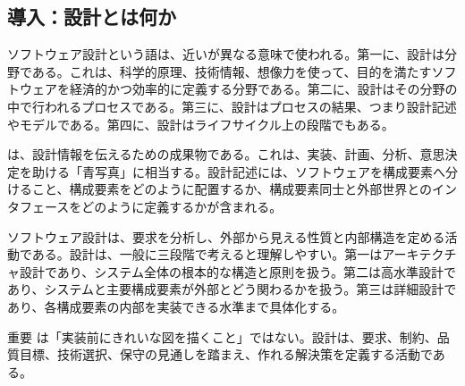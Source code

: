 \subsection*{導入：設計とは何か}

ソフトウェア設計という語は、近いが異なる意味で使われる。第一に、設計は分野である。これは、科学的原理、技術情報、想像力を使って、目的を満たすソフトウェアを経済的かつ効率的に定義する分野である。第二に、設計はその分野の中で行われるプロセスである。第三に、設計はプロセスの結果、つまり設計記述やモデルである。第四に、設計はライフサイクル上の段階でもある。

 は、設計情報を伝えるための成果物である。これは、実装、計画、分析、意思決定を助ける「青写真」に相当する。設計記述には、ソフトウェアを構成要素へ分けること、構成要素をどのように配置するか、構成要素同士と外部世界とのインタフェースをどのように定義するかが含まれる。

ソフトウェア設計は、要求を分析し、外部から見える性質と内部構造を定める活動である。設計は、一般に三段階で考えると理解しやすい。第一はアーキテクチャ設計であり、システム全体の根本的な構造と原則を扱う。第二は高水準設計であり、システムと主要構成要素が外部とどう関わるかを扱う。第三は詳細設計であり、各構成要素の内部を実装できる水準まで具体化する。

\begin{pointbox}{重要}
は「実装前にきれいな図を描くこと」ではない。設計は、要求、制約、品質目標、技術選択、保守の見通しを踏まえ、作れる解決策を定義する活動である。
\end{pointbox}
